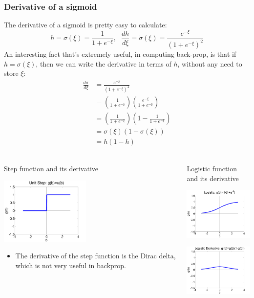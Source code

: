 \documentclass{beamer}
\begin{document}
\begin{frame}
  \frametitle{Derivative of a sigmoid}
  The derivative of a sigmoid is pretty easy to calculate:
  \[
  h=\sigma(\xi)=\frac{1}{1+e^{-\xi}},~~~\frac{dh}{d\xi}=\dot\sigma(\xi)=\frac{e^{-\xi}}{(1+e^{-\xi})^2}
  \]
  An interesting fact that's extremely useful, in computing back-prop,
  is that if $h=\sigma(\xi)$, then we can write the derivative in terms
  of $h$, without any need to store $\xi$:
  \begin{align*}
    \frac{d\sigma}{d\xi} &=\frac{e^{-\xi}}{(1+e^{-\xi})^2}\\
    &=\left(\frac{1}{1+e^{-\xi}}\right)\left(\frac{e^{-\xi}}{1+e^{-\xi}}\right)\\
    &=\left(\frac{1}{1+e^{-\xi}}\right)\left(1-\frac{1}{1+e^{-\xi}}\right)\\
    &=\sigma(\xi)(1-\sigma(\xi))\\
    &=h(1-h)\\
  \end{align*}
\end{frame}

\begin{frame}
  \begin{columns}[t]
    \column{2.25in}
    \begin{block}{Step function and its derivative}
      \centerline{\includegraphics[width=1.75in]{figs/nn_unitstep.png}}
      \begin{itemize}
      \item The derivative of the step function is the Dirac
        delta, which is not very useful in backprop.
      \end{itemize}
    \end{block}
    \column{2.25in}
    \begin{block}{Logistic function and its derivative}
      \centerline{\includegraphics[width=1.75in]{figs/nn_logistic.png}}
      \centerline{\includegraphics[width=1.75in]{figs/nn_logisticprime.png}}
    \end{block}
  \end{columns}
\end{frame}
\end{document}
